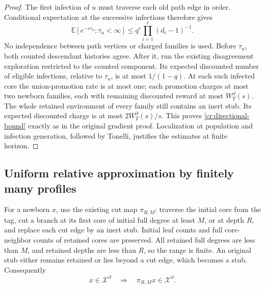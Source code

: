\begin{proof}
The first infection of $u$ must traverse each old path edge in order.
Conditional expectation at the successive infections therefore gives
\[
 \mathbb E[e^{-s\tau_u};\tau_u<\infty]
 \le q^r\prod_{i=1}^r(d_i-1)^{-1}.
\]
No independence between path vertices or charged families is used.
Before $\tau_u$, both counted descendant histories agree.  After it,
run the existing disagreement exploration restricted to the counted
component.  Its expected discounted number of eligible infections,
relative to $\tau_u$, is at most $1/(1-q)$.  At each such infected
core the union-promotion rate is at most one; each promotion charges
at most two newborn families, each with remaining discounted reward
at most $W_T^\partial(s)$.  The whole retained environment of every
family still contains an inert stub.  Its expected discounted charge
is at most $2W_T^\partial(s)/s$.  This proves
\eqref{cr:directional-bound} exactly as in the original gradient proof.
Localization at population and infection generation, followed by
Tonelli, justifies the estimates at finite horizon.
\end{proof}

\subsection{Uniform relative approximation by finitely many profiles}

For a newborn $x$, use the existing cut map $\pi_{R,M}$: traverse the
initial core from the tag, cut a branch at its first core of initial
full degree at least $M$, or at depth $R$, and replace each cut edge
by an inert stub.  Initial leaf counts and full core-neighbor counts
of retained cores are preserved.  All retained full degrees are less
than $M$, and retained depths are less than $R$, so the range is
finite.  An original stub either remains retained or lies beyond a
cut edge, which becomes a stub.  Consequently
\[
 x\in\mathcal X^\partial\quad\Longrightarrow\quad
 \pi_{R,M}x\in\mathcal X^\partial.
\]


